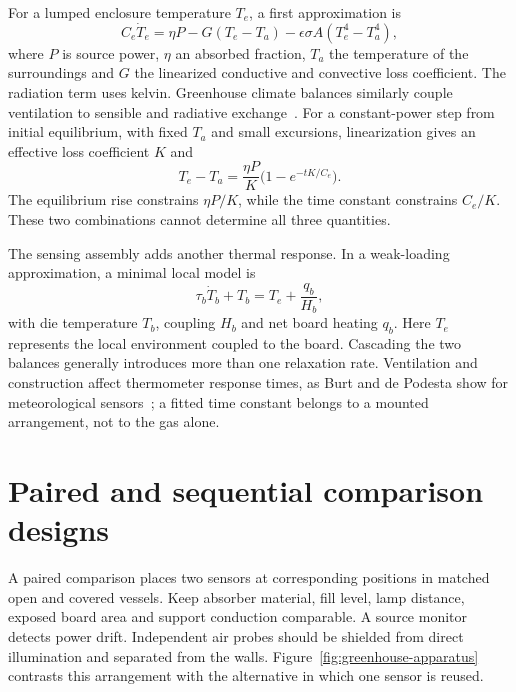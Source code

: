 For a lumped enclosure temperature $T_e$, a first approximation is
\begin{equation}
 C_e\dot T_e=\eta P-G(T_e-T_a)
 -\epsilon\sigma A(T_e^4-T_a^4),
 \label{eq:greenhouse-energy}
\end{equation}
where $P$ is source power, $\eta$ an absorbed fraction, $T_a$ the temperature of the surroundings and $G$ the linearized conductive and convective loss coefficient. The radiation term uses kelvin. Greenhouse climate balances similarly couple ventilation to sensible and radiative exchange~\cite{boulard1993}. For a constant-power step from initial equilibrium, with fixed $T_a$ and small excursions, linearization gives an effective loss coefficient $K$ and
\begin{equation}
 T_e-T_a=\frac{\eta P}{K}\bigl(1-e^{-tK/C_e}\bigr).
 \label{eq:greenhouse-step}
\end{equation}
The equilibrium rise constrains $\eta P/K$, while the time constant constrains $C_e/K$. These two combinations cannot determine all three quantities.

The sensing assembly adds another thermal response. In a weak-loading approximation, a minimal local model is
\begin{equation}
 \tau_b\dot T_b+T_b=T_e+\frac{q_b}{H_b},
 \label{eq:greenhouse-sensor}
\end{equation}
with die temperature $T_b$, coupling $H_b$ and net board heating $q_b$. Here $T_e$ represents the local environment coupled to the board. Cascading the two balances generally introduces more than one relaxation rate. Ventilation and construction affect thermometer response times, as Burt and de Podesta show for meteorological sensors~\cite{burt2020}; a fitted time constant belongs to a mounted arrangement, not to the gas alone.

\section{Paired and sequential comparison designs}
A paired comparison places two sensors at corresponding positions in matched open and covered vessels. Keep absorber material, fill level, lamp distance, exposed board area and support conduction comparable. A source monitor detects power drift. Independent air probes should be shielded from direct illumination and separated from the walls. Figure~\ref{fig:greenhouse-apparatus} contrasts this arrangement with the alternative in which one sensor is reused.


